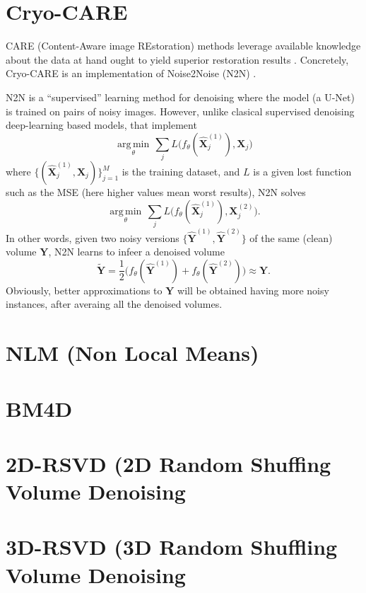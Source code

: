 \documentclass{article}
\begin{document}




\section{Cryo-CARE \cite{buchholz2019cryo}}
CARE (Content-Aware image REstoration) methods leverage
available knowledge about the data at hand ought to yield superior
restoration results \cite{weigert2018content}. Concretely, Cryo-CARE
is an implementation of Noise2Noise (N2N) \cite{lehtinen2018noise2noise}.

N2N is a ``supervised'' learning method for denoising where the model
(a U-Net) is trained on pairs of noisy images. However, unlike
clasical supervised denoising deep-learning based models, that
implement
\begin{equation}
  \underset{\theta}{\operatorname{arg\,min}} \, \sum_j L \big(f_\theta(\hat{\mathbf X}_j^{(1)}), {\mathbf X}_j\big)
\end{equation}
where $\{(\hat{\mathbf X}_j^{(1)}, {\mathbf X}_j)\}_{j=1}^M$ is the training
dataset, and $L$ is a given lost function such as the MSE (here higher
values mean worst results), N2N solves
\begin{equation}
  \underset{\theta}{\operatorname{arg\,min}} \, \sum_j L \big(f_\theta(\hat{\mathbf X}_j^{(1)}), {\mathbf X}_j^{(2)}\big).
\end{equation}
In other words, given two noisy versions
$\{\hat{\mathbf Y}^{(1)}, \hat{\mathbf Y}^{(2)}\}$ of the same (clean)
volume ${\mathbf Y}$, N2N learns to infeer a denoised volume
\begin{equation}
  \tilde{\mathbf Y}=\frac{1}{2}\big(f_\theta(\hat{\mathbf Y}^{(1)})+f_\theta(\hat{\mathbf Y}^{(2)})\big)\approx{\mathbf Y}.
\end{equation}
Obviously, better approximations to ${\mathbf Y}$ will be obtained
having more noisy instances, after averaing all the denoised volumes.

\section{NLM (Non Local Means)} 

\section{BM4D}

\section{2D-RSVD (2D Random Shuffing Volume Denoising}

\section{3D-RSVD (3D Random Shuffling Volume Denoising}




\end{document}
